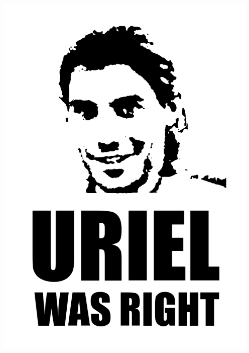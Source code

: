 \documentclass{article}
\begin{document}
\begin{center}
	\includegraphics[width=5in,height=8in]{urielwasright.png}
\end{center}
\end{document}

